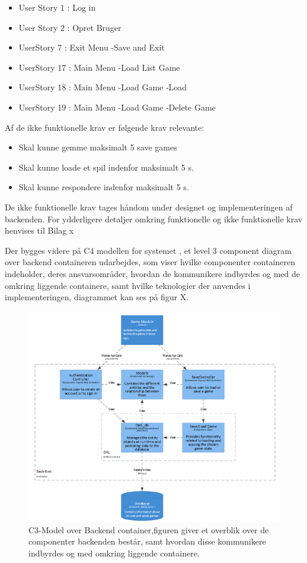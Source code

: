 \begin{itemize}
\item User Story 1 : Log in
\item User Story 2 : Opret Bruger
\item UserStory 7 : Exit Menu -\g Save and Exit
\item UserStory 17 : Main Menu -\g Load List Game
\item UserStory 18 : Main Menu -\g Load Game -\g Load
\item UserStory 19 : Main Menu -\g Load Game -\g Delete Game
\end{itemize}
Af de ikke funktionelle krav er følgende krav relevante:
\begin{itemize}
\item Skal kunne gemme maksimalt 5 save games
\item Skal kunne loade et spil indenfor maksimalt 5 s.
\item Skal kunne respondere indenfor maksimalt 5 s.
\end{itemize}
De ikke funktionelle krav tages håndom under designet og implementeringen af backenden.
For ydderligere detaljer omkring funktionelle og ikke funktionelle krav henvises til Bilag x


Der bygges videre på C4 modellen for systemet , et level 3 component diagram over backend containeren udarbejdes, som viser hvilke componenter containeren indeholder, deres ansvarsområder, hvordan de kommunikere indbyrdes og med de omkring liggende containere, samt hvilke teknologier der anvendes i implementeringen, diagrammet kan ses på figur X. 


\begin{figure}[H]
\centering
\includegraphics[width = \textwidth]{02-Body/Images/Backend_C3.PNG}
\caption{C3-Model over Backend container,figuren giver et overblik over de componenter backenden består, samt hvordan disse kommunikere indbyrdes og med omkring liggende containere.}
\label{fig:Arkitektur-Backend-C3}
\end{figure}


